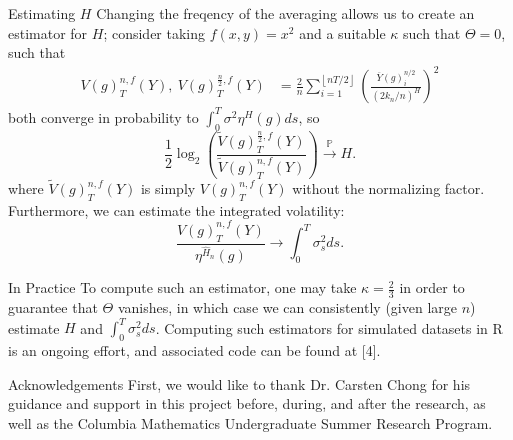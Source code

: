 \documentclass[final,hyperref={pdfpagelabels=false}]{beamer}
\begin{document}
\begin{frame}{}
\begin{columns}[t]
      \begin{column}{0.28\linewidth}
        \begin{block}{Estimating \(H\)}
          Changing the freqency of the averaging allows us to create an estimator for \(H\); consider taking \(f(x, y) = x^2\) and a suitable \(\kappa\) such that \(\Theta = 0\), such that 
          \begin{align*}
            V(g)^{n,f}_T(Y), \ V(g)^{\frac{n}{2},f}_T(Y) &= \frac{2}{n}\sum_{i=1}^{\left\lfloor nT/2 \right\rfloor} \left(\frac{\overline{Y}(g)^{n/2}_i}{(2k_n/n)^H}\right)^2
          \end{align*}
          both converge in probability to \( \int_0^T \sigma^2\eta^H(g) ds\), so
          \[
            \frac{1}{2} \log_2\left(\frac{\widetilde{V}(g)^{\frac{n}{2},f}_T(Y)}{\widetilde{V}(g)^{n,f}_T(Y)}\right) \overset{\mathbb{P}}{\rightarrow} H.
          \]
          where \(\widetilde{V}(g)^{n,f}_T(Y)\) is simply \(V(g)^{n,f}_T(Y)\) without the normalizing factor.
          Furthermore, we can estimate the integrated volatility:
          \[
            \frac{V(g)^{n,f}_T(Y)}{\eta^{\hat{H}_n}(g)} \rightarrow \int_0^T\sigma^2_sds.
          \]
        \end{block}
        \begin{block}{In Practice}
          To compute such an estimator, one may take \(\kappa = \frac{2}{3}\) in order to guarantee that \(\Theta\) vanishes, in which case we can consistently (given large \(n\)) estimate \(H\) and \(\int_0^T \sigma_s^2ds\). Computing such estimators for simulated datasets in R is an ongoing effort, and associated code can be found at [4].
        \end{block}
        \begin{block}{Acknowledgements}
          First, we would like to thank Dr. Carsten Chong for his guidance and support in this project before, during, and after the research, as well as the Columbia Mathematics Undergraduate Summer Research Program.
        \end{block}


\end{column}
\end{columns}
\end{frame}
\end{document}
